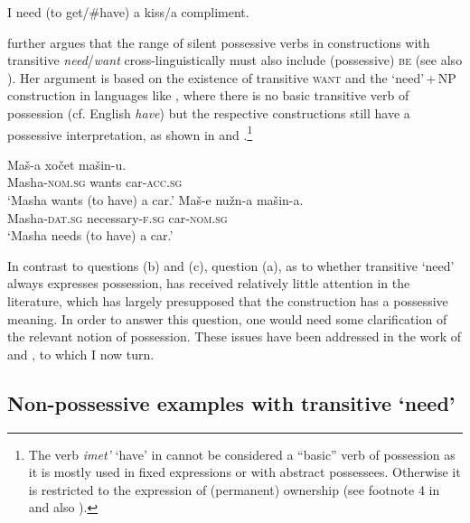\documentclass[output=paper]{langscibook}
\begin{document}
\ea\label{get} I need (to get/\#have) a kiss/a compliment.\hfill \citep[215]{Harves2008}\label{need-get}
\z

\noindent \citet{Harves2008} further argues that the range of silent possessive verbs in constructions with transitive \textit{need}/\textit{want} cross-linguistically must also include (possessive) \textsc{be} (see also \citealt{Harves.Kayne2012}). Her argument is based on the existence of transitive \textsc{want} and the `need'\,+\,NP construction in languages like , where there is no basic transitive verb of possession (cf. English \textit{have}) but the respective constructions still have a possessive interpretation, as shown in  and .\footnote{\label{footnote-imet}The verb \textit{imet'} `have' in  cannot be considered a ``basic'' verb of possession as it is mostly used in fixed expressions or with abstract possessees. Otherwise it is restricted to the expression of (permanent) ownership (see footnote 4 in \citealt{Harves.Kayne2012} and also \citealt[440ff.]{Stolz.Kettler.Stroh.Urdze2008}).}

\ea
\ea \gll Maš-a xočet mašin-u.\label{xotet}\\
Masha-\textsc{nom.sg} wants car-\textsc{acc.sg}\\
\glt `Masha wants (to have) a car.'
\ex \gll Maš-e nužn-a mašin-a.\label{nuzhen}\\
Masha-\textsc{dat.sg} necessary-\textsc{f.sg} car-\textsc{nom.sg}\\
\glt `Masha needs (to have) a car.'
\z\z

\noindent In contrast to questions (b) and (c), question (a), as to whether transitive `need' always expresses possession, has received relatively little attention in the literature, which has largely presupposed that the construction has a possessive meaning. In order to answer this question, one would need some clarification of the relevant notion of possession. These issues have been addressed in the work of \citet{Schwarz2006} and \citet{Zaroukian.Beller2013}, to which I now turn.

\subsection{Non-possessive examples with transitive `need'}\label{section-problematic}
\end{document}
